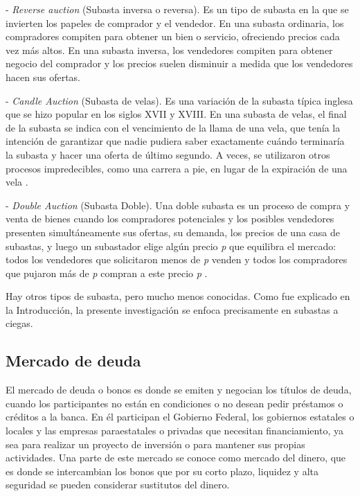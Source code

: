     - \textit{Reverse auction} (Subasta inversa o reversa).
    Es un tipo de subasta en la que se invierten los papeles de comprador y el vendedor. En una subasta ordinaria, los compradores compiten 
    para obtener un bien o servicio, ofreciendo precios cada vez más altos. En una subasta inversa, los vendedores compiten para obtener 
    negocio del comprador y los precios suelen disminuir a medida que los vendedores hacen sus ofertas.

    - \textit{Candle Auction} (Subasta de velas).
    Es una variación de la subasta típica inglesa que se hizo popular en los siglos XVII y XVIII. En una subasta de velas, el final 
    de la subasta se indica con el vencimiento de la llama de una vela, que tenía la intención de garantizar que nadie pudiera saber 
    exactamente cuándo terminaría la subasta y hacer una oferta de último segundo. A veces, se utilizaron otros procesos impredecibles, 
    como una carrera a pie, en lugar de la expiración de una vela \parencite{patten1970}.

    - \textit{Double Auction} (Subasta Doble).
    Una doble subasta es un proceso de compra y venta de bienes cuando los compradores potenciales y los posibles vendedores presenten 
    simultáneamente sus ofertas, su demanda, los precios de una casa de subastas, y luego un subastador elige algún precio \textit{p} que 
    equilibra el mercado: todos los vendedores que solicitaron menos de \textit{p} venden y todos los compradores que pujaron más de 
    \textit{p} compran a este precio \textit{p} \parencite{friedman1992}.
    
    Hay otros tipos de subasta, pero mucho menos conocidas. Como fue explicado en la Introducción, la presente investigación se enfoca precisamente en subastas a ciegas.

  \subsection{Mercado de deuda} \hspace*{}

    El mercado de deuda o bonos es donde se emiten y negocian los títulos de deuda, cuando los participantes no están en condiciones o no desean pedir préstamos o créditos a la banca. En él participan el Gobierno Federal, los gobiernos estatales o locales y las empresas paraestatales o privadas que necesitan financiamiento, ya sea para realizar un proyecto de inversión o para mantener sus propias actividades. Una parte de este mercado se conoce como mercado del dinero, que es donde se intercambian los bonos que por su corto plazo, liquidez y alta seguridad se pueden considerar sustitutos del dinero.


